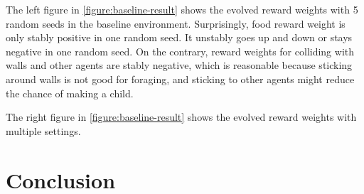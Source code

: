 The left figure in \cref{figure:baseline-result} shows the evolved reward weights with 5 random seeds in the baseline environment. Surprisingly, food reward weight is only stably positive in one random seed. It unstably goes up and down or stays negative in one random seed. On the contrary, reward weights for colliding with walls and other agents are stably negative, which is reasonable because sticking around walls is not good for foraging, and sticking to other agents might reduce the chance of making a child.

The right figure in \cref{figure:baseline-result} shows the evolved reward weights with multiple settings.

\section{Conclusion}